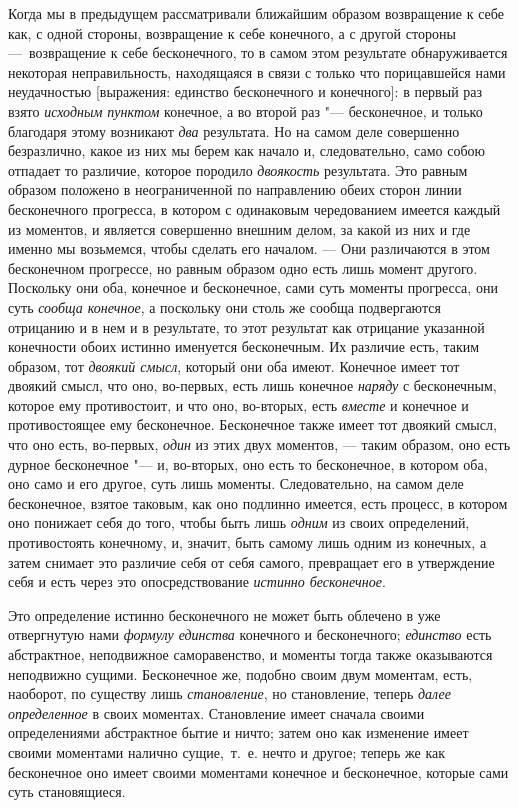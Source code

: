 Когда мы в предыдущем рассматривали ближайшим образом возвращение к себе
как, с одной стороны, возвращение к себе конечного, а с другой стороны
—~возвращение к себе бесконечного, то в самом этом результате
обнаруживается некоторая неправильность, находящаяся в связи с только что
порицавшейся нами неудачностью [выражения: единство бесконечного и
конечного]: в первый раз взято {\em исходным пунктом}
конечное, а во второй раз "--- бесконечное, и только благодаря этому возникают
{\em два} результата. Но на самом деле совершенно
безразлично, какое из них мы берем как начало и, следовательно, само собою
отпадает то различие, которое породило {\em двоякость}
результата. Это равным образом положено в неограниченной по направлению
обеих сторон линии бесконечного прогресса, в котором с одинаковым
чередованием имеется каждый из моментов, и является совершенно внешним
делом, за какой из них и где именно мы возьмемся, чтобы сделать его
началом. — Они различаются в этом бесконечном прогрессе, но равным образом
одно есть лишь момент другого. Поскольку они оба, конечное и бесконечное,
сами суть моменты прогресса, они суть {\em сообща
конечное}, а поскольку они столь же сообща подвергаются отрицанию и в нем и
в результате, то этот результат как отрицание указанной конечности обоих
истинно именуется бесконечным. Их различие есть, таким образом, тот
{\em двоякий смысл}, который они оба имеют. Конечное
имеет тот двоякий смысл, что оно, во-первых, есть лишь конечное
{\em наряду} с бесконечным, которое ему противостоит, и
что оно, во-вторых, есть {\em вместе} и конечное и
противостоящее ему бесконечное. Бесконечное также имеет тот двоякий смысл,
что оно есть, во-первых, {\em один} из этих двух
моментов, — таким образом, оно есть дурное бесконечное "--- и, во-вторых, оно
есть то бесконечное, в котором оба, оно само и его другое, суть лишь
моменты. Следовательно, на самом деле бесконечное, взятое таковым, как оно
подлинно имеется, есть процесс, в котором оно понижает себя до того, чтобы
быть лишь {\em одним} из своих определений,
противостоять конечному, и, значит, быть самому лишь одним из конечных, а
затем снимает это различие себя от себя самого, превращает его в
утверждение себя и есть через это опосредствование
{\em истинно бесконечное}.

Это определение истинно бесконечного не может быть облечено в уже
отвергнутую нами {\em формулу единства} конечного и
бесконечного; {\em единство} есть абстрактное,
неподвижное саморавенство, и моменты тогда также оказываются неподвижно
сущими. Бесконечное же, подобно своим двум моментам, есть, наоборот, по
существу лишь {\em становление}, но становление, теперь
{\em далее определенное} в своих моментах. Становление
имеет сначала своими определениями абстрактное бытие и ничто; затем оно как
изменение имеет своими моментами налично сущие,~т.~е. нечто и другое;
теперь же как бесконечное оно имеет своими моментами конечное и
бесконечное, которые сами суть становящиеся.

